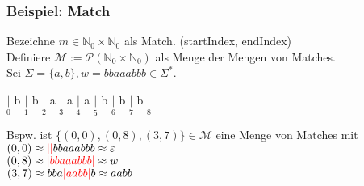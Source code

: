 \documentclass{beamer}
\newcommand{\red}[1]{\textcolor{red}{#1}}
\begin{document}
    \begin{frame}[t]
        \frametitle{\textbf{Beispiel:} Match}
        Bezeichne $m \in \mathbb{N}_0 \times \mathbb{N}_0$ als Match. \hfill(startIndex, endIndex)\\
        Definiere $\mathcal{M} := \mathcal{P}(\mathbb{N}_0 \times \mathbb{N}_0)$ als Menge der Mengen
        von Matches.\\[5pt]
        Sei $\Sigma = \{a,b\}, w = bbaaabbb \in \Sigma^*$.\\[30pt]
        \begin{center}
            $\underset{0}{|}$
                {\Large b}
            $\underset{1}{|}$
                {\Large b}
            $\underset{2}{|}$
                {\Large a}
            $\underset{3}{|}$
                {\Large a}
            $\underset{4}{|}$
                {\Large a}
            $\underset{5}{|}$
                {\Large b}
            $\underset{6}{|}$
                {\Large b}
            $\underset{7}{|}$
                {\Large b}
            $\underset{8}{|}$\\[30pt]
        \end{center}
        \pause
        Bspw. ist $\{(0,0),(0,8),(3,7)\} \in \mathcal{M}$ eine Menge von Matches mit\\[5pt]
        $(0,0) \approx \red{||}bbaaabbb \approx \varepsilon$\\
        $(0,8) \approx \red{|bbaaabbb|} \approx w$\\
        $(3,7) \approx bba\red{|aabb|}b\approx aabb$\\
    \end{frame}



\end{document}

